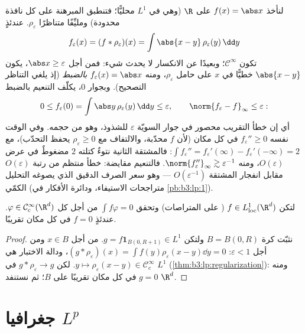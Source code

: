 \begin{example}
\label{ex:b3:lp:mollifyexample}
لنأخذ $f(x) = \abs x$ على $\R$ (وهي في $L^1$ محليًّا؛ فتنطبق
المبرهنة على كل نافذة محدودة) ومليِّفًا متناظرًا $\rho_\varepsilon$. عندئذٍ
\[
f_\varepsilon(x) = (f * \rho_\varepsilon)(x)
= \int\abs{x - y}\,\rho_\varepsilon(y)\,\dd y
\]
تكون $\mathcal C^\infty$؛ وبعيدًا عن الانكسار لا يحدث شيء: فمن أجل $\abs x \geq \varepsilon$،
يكون $\abs{x - y}$ خطيًّا في $x$ على حامل $\rho_\varepsilon$، ومنه $f_\varepsilon(x) =
\abs x$
\emph{بالضبط} (إذ يلغي التناظر التصحيح). وبجوار $0$، يكلّف
التنعيم بالضبط
\[
0 \leq f_\varepsilon(0) = \int\abs
y\,\rho_\varepsilon(y)\,\dd y \leq \varepsilon,
\qquad
\norm{f_\varepsilon - f}_\infty \leq \varepsilon :
\]
أي إن خطأ التقريب محصور في جوار السويّة $\varepsilon$ للشذوذ،
وهو من حجمه. وفي الوقت نفسه $f_\varepsilon'' \geq 0$ في كل مكان (لأن $f$ محدّبة،
والالتفاف مع $\rho_\varepsilon
\geq 0$ يحفظ التحدّب)، مع $\int f_\varepsilon'' =
f_\varepsilon'(\infty) - f_\varepsilon'(-\infty) = 2$: فالمشتقة الثانية
نتوءٌ كتلته $2$ مضغوطٌ في عرض $O(\varepsilon)$، ومنه $\norm{f_\varepsilon''}_\infty \gtrsim
\varepsilon^{-1}$. فالتنعيم مقايضة: خطأ
منتظم من رتبة $O(\varepsilon)$ مقابل انفجار المشتقة $O(\varepsilon^{-1})$ ---
وهو سعر الصرف الدقيق الذي يصوغه التحليل الكمّي (متراجحات
الاستيفاء، ودائرة الأفكار في \cref{pb:b3:lp:1}).
\end{example}

\begin{corollary}\label{cor:b3:lp:fundlemma}
لتكن $f \in L^1_{\mathrm{loc}}(\R^d)$ ( على المتراصات) وتحقق $\int f\varphi = 0$ من أجل
كل $\varphi \in \mathcal
C^\infty_c(\R^d)$. عندئذٍ $f = 0$ في كل مكان تقريبًا.
\end{corollary}

\begin{proof}
نثبّت كرة $B = B(0, R)$ ولتكن $g = f\mathbf 1_{B(0, R+1)}
\in L^1$. من أجل $x \in B$ ومن أجل
$\varepsilon < 1$: $(g *
\rho_\varepsilon)(x) = \int f(y)\rho_\varepsilon(x - y)\dd y =
0$، ودالة الاختبار هي $y \mapsto \rho_\varepsilon(x-y)
\in \mathcal C_c^\infty$. لكن $g * \rho_\varepsilon \to g$ في
$L^1$ (\cref{thm:b3:lp:regularization}): ومنه $g = 0$ في كل مكان تقريبًا على $B$؛ ثم
نستنفد $\R^d$.
\end{proof}

\section{جغرافيا \texorpdfstring{$L^p$}{Lp}}

